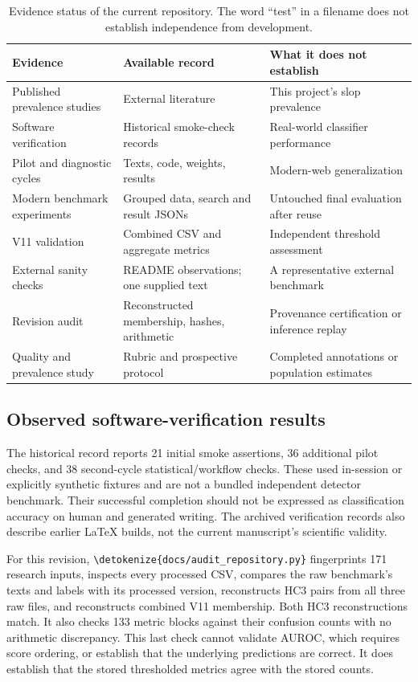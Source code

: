 \documentclass[11pt]{article}
\newcommand{\code}[1]{\expandafter\nolinkurl\expandafter{\detokenize{#1}}}
\begin{document}
\begin{table}[htbp]
\centering\small
\begin{tabularx}{\linewidth}{l>{\raggedright\arraybackslash}X>{\raggedright\arraybackslash}X}
\toprule
Evidence & Available record & What it does not establish \\
\midrule
Published prevalence studies & External literature & This project's slop prevalence \\
Software verification & Historical smoke-check records & Real-world classifier performance \\
Pilot and diagnostic cycles & Texts, code, weights, results & Modern-web generalization \\
Modern benchmark experiments & Grouped data, search and result JSONs & Untouched final evaluation after reuse \\
V11 validation & Combined CSV and aggregate metrics & Independent threshold assessment \\
External sanity checks & README observations; one supplied text & A representative external benchmark \\
Revision audit & Reconstructed membership, hashes, arithmetic & Provenance certification or inference replay \\
Quality and prevalence study & Rubric and prospective protocol & Completed annotations or population estimates \\
\bottomrule
\end{tabularx}
\caption{Evidence status of the current repository. The word ``test'' in a
filename does not establish independence from development.}
\label{tab:status}
\end{table}

\subsection{Observed software-verification results}
The historical record reports 21 initial smoke assertions, 36 additional
pilot checks, and 38 second-cycle statistical/workflow checks. These used
in-session or explicitly synthetic fixtures and are not a bundled independent
detector benchmark. Their successful completion should not be expressed as
classification accuracy on human and generated writing. The archived
verification records also describe earlier LaTeX builds, not the current
manuscript's scientific validity.

For this revision, \code{docs/audit_repository.py} fingerprints 171 research
inputs, inspects every processed CSV, compares the raw benchmark's texts and
labels with its processed version, reconstructs HC3 pairs from all three raw
files, and reconstructs combined V11 membership. Both HC3 reconstructions
match. It also checks 133 metric blocks against their confusion counts with
no arithmetic discrepancy. This last check cannot validate AUROC, which
requires score ordering, or establish that the underlying predictions are
correct. It does establish that the stored thresholded metrics agree with
the stored counts.
\end{document}
